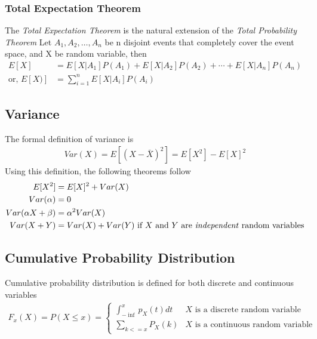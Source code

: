 \documentclass[../probability-notes.tex]{subfiles}
\begin{document}
    \subsubsection{Total Expectation Theorem}
    The \emph{Total Expectation Theorem} is the natural extension of the \emph{Total Probability Theorem}
    Let $A_{1}, A_{2}, \ldots, A_{n}$ be n disjoint events that completely cover the event space, and X be random variable, then
    \begin{align*}
        E[X] &= E[X|A_{1}]P(A_{1}) + E[X|A_{2}]P(A_{2}) + \cdots + E[X|A_{n}]P(A_{n})\\
        \text{or, } E[X)] &= \sum_{i=1}^{n} E[X|A_{i}]P(A_{i})
    \end{align*}

    \subsection{Variance}
    The formal definition of variance is
    \begin{align*}
        Var(X) = E[(X - \bar{X})^{2}] = E[X^{2}] - E[X]^{2}
    \end{align*}
    Using this definition, the following theorems follow
    \begin{align*}
        E[X^{2}] &= E[X]^{2} + Var(X) \\
        Var(\alpha) &= 0 \\
        Var(\alpha X + \beta) &= \alpha^{2} Var(X) \\
        Var(X + Y) &= Var(X) + Var(Y) \text{  if $X$ and $Y$ are \emph{independent} random variables}
    \end{align*}

    \subsection{Cumulative Probability Distribution}
    Cumulative probability distribution is defined for both discrete and continuous variables
    \begin{align*}
        F_{x}(X) = P(X \leq x) = \begin{cases} \int_{-\inf}^{x} p_{X}(t) dt &\mbox{$X$ is a discrete random variable}\\
        \sum_{k <= x} P_{X}(k) &\mbox{$X$ is a continuous random variable} \end{cases}
    \end{align*}


\end{document}
